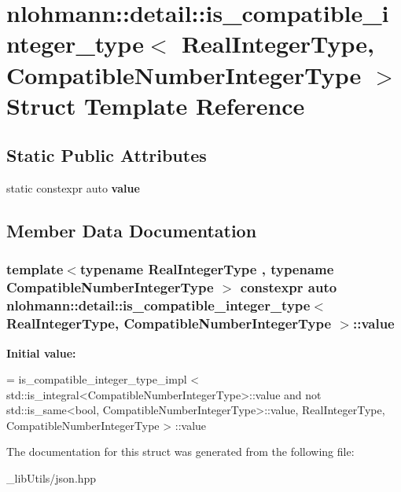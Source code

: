 \hypertarget{structnlohmann_1_1detail_1_1is__compatible__integer__type}{}\section{nlohmann\+:\+:detail\+:\+:is\+\_\+compatible\+\_\+integer\+\_\+type$<$ Real\+Integer\+Type, Compatible\+Number\+Integer\+Type $>$ Struct Template Reference}
\label{structnlohmann_1_1detail_1_1is__compatible__integer__type}
\subsection*{Static Public Attributes}
\begin{DoxyCompactItemize}
\item 
static constexpr auto {\bfseries value}
\end{DoxyCompactItemize}


\subsection{Member Data Documentation}
\subsubsection[{\texorpdfstring{value}{value}}]{\setlength{\rightskip}{0pt plus 5cm}template$<$typename Real\+Integer\+Type , typename Compatible\+Number\+Integer\+Type $>$ constexpr auto {\bf nlohmann\+::detail\+::is\+\_\+compatible\+\_\+integer\+\_\+type}$<$ Real\+Integer\+Type, Compatible\+Number\+Integer\+Type $>$\+::value\hspace{0.3cm}{\ttfamily [static]}}\hypertarget{structnlohmann_1_1detail_1_1is__compatible__integer__type_ac5e5bd39773676564c73d3dd2a9c6e0a}{}\label{structnlohmann_1_1detail_1_1is__compatible__integer__type_ac5e5bd39773676564c73d3dd2a9c6e0a}
{\bfseries Initial value\+:}
\begin{DoxyCode}
=
        is\_compatible\_integer\_type\_impl <
        std::is\_integral<CompatibleNumberIntegerType>::value and
        not std::is\_same<bool, CompatibleNumberIntegerType>::value,
        RealIntegerType, CompatibleNumberIntegerType > ::value
\end{DoxyCode}


The documentation for this struct was generated from the following file\+:\begin{DoxyCompactItemize}
\item 
\+\_\+lib\+Utils/json.\+hpp\end{DoxyCompactItemize}
